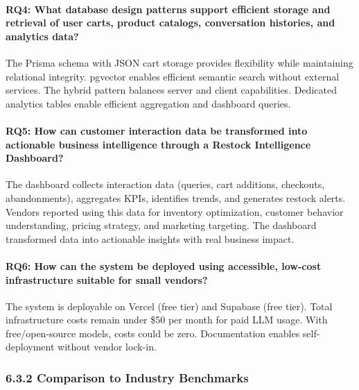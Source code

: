 \documentclass[12pt,a4paper]{article}
\begin{document}
\paragraph{RQ4: What database design patterns support efficient storage and retrieval of user carts, product catalogs, conversation histories, and analytics data?}

The Prisma schema with JSON cart storage provides flexibility while maintaining relational integrity. pgvector enables efficient semantic search without external services. The hybrid pattern balances server and client capabilities. Dedicated analytics tables enable efficient aggregation and dashboard queries.

\paragraph{RQ5: How can customer interaction data be transformed into actionable business intelligence through a Restock Intelligence Dashboard?}

The dashboard collects interaction data (queries, cart additions, checkouts, abandonments), aggregates KPIs, identifies trends, and generates restock alerts. Vendors reported using this data for inventory optimization, customer behavior understanding, pricing strategy, and marketing targeting. The dashboard transformed data into actionable insights with real business impact.

\paragraph{RQ6: How can the system be deployed using accessible, low-cost infrastructure suitable for small vendors?}

The system is deployable on Vercel (free tier) and Supabase (free tier). Total infrastructure costs remain under \$50 per month for paid LLM usage. With free/open-source models, costs could be zero. Documentation enables self-deployment without vendor lock-in.

\subsubsection{6.3.2 Comparison to Industry Benchmarks}
\end{document}
